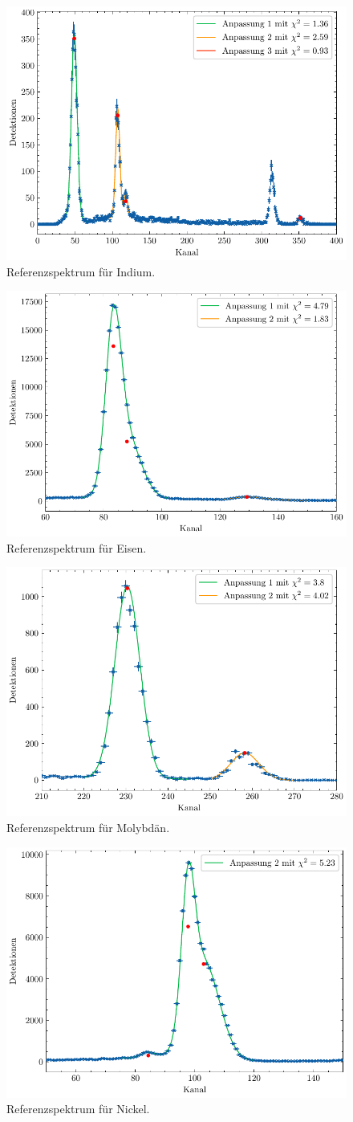 \begin{figure}[H]
	\centering
	\includegraphics[width=0.6\linewidth]{../figs/In.pdf}
	\caption{Referenzspektrum für Indium.}
	\label{fig:in}
\end{figure}
\begin{figure}[H]
	\centering
	\includegraphics[width=0.6\linewidth]{../figs/Fe.pdf}
	\caption{Referenzspektrum für Eisen.}
	\label{fig:fe}
\end{figure}
\begin{figure}[H]
	\centering
	\includegraphics[width=0.6\linewidth]{../figs/Mo.pdf}
	\caption{Referenzspektrum für Molybdän.}
	\label{fig:mo}
\end{figure}
\begin{figure}[H]
	\centering
	\includegraphics[width=0.6\linewidth]{../figs/Ni.pdf}
	\caption{Referenzspektrum für Nickel.}
	\label{fig:ni}
\end{figure}
